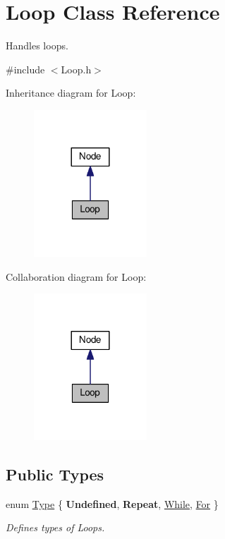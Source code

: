 \hypertarget{classLoop}{}\section{Loop Class Reference}
\label{classLoop}


Handles loops.  




{\ttfamily \#include $<$Loop.\+h$>$}



Inheritance diagram for Loop\+:
\nopagebreak
\begin{figure}[H]
\begin{center}
\leavevmode
\includegraphics[width=120pt]{classLoop__inherit__graph}
\end{center}
\end{figure}


Collaboration diagram for Loop\+:
\nopagebreak
\begin{figure}[H]
\begin{center}
\leavevmode
\includegraphics[width=120pt]{classLoop__coll__graph}
\end{center}
\end{figure}
\subsection*{Public Types}
\begin{DoxyCompactItemize}
\item 
enum \hyperlink{classLoop_af57e9c094063c514758dfe7bd986d6e7}{Type} \{ {\bfseries Undefined}, 
{\bfseries Repeat}, 
\hyperlink{classLoop_af57e9c094063c514758dfe7bd986d6e7a681be1f5a1ab60d13010c6df3358088e}{While}, 
\hyperlink{classLoop_af57e9c094063c514758dfe7bd986d6e7a7637227f2d51adc47dea05b5fe6802ac}{For}
 \}
\begin{DoxyCompactList}\small\item\em Defines types of Loops. \end{DoxyCompactList}\end{DoxyCompactItemize}
